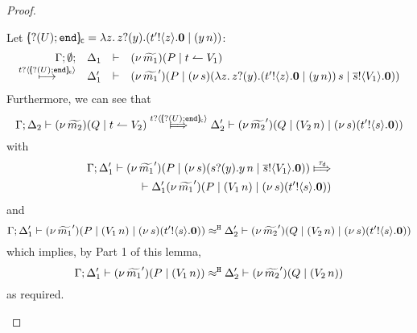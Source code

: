 \begin{proof}
\begin{enumerate}[$-$]
\begin{enumerate}
\begin{enumerate}[i)]
							Let $[\!\!(? (U) ; \mathtt{end})\!\!]_{\mathsf{c}} = \lambda z.\, z ? (y) . ( t' ! \langle z \rangle . \mathbf{0} \;|\; (y\, {n}) ) $:
							\[
								\begin{array}{rcll} \Gamma; \emptyset; &\Delta_1& \vdash& (\nu\, \widetilde{m_1})(P \;|\; t \leftharpoonup V_1  ) \\ \stackrel{t ? \langle [\!\!(? (U) ; \mathtt{end})\!\!]_{\mathsf{c}} \rangle}{\longmapsto} &\Delta_1'& \vdash &  (\nu\, \widetilde{m_1}')(P \;|\; (\nu\, s)(\lambda z.\, z ? (y) . ( t' ! \langle z \rangle . \mathbf{0} \;|\; (y\, {n}) )\, {s} \;|\; \overline{s} ! \langle V_1 \rangle . \mathbf{0})) \end{array}
							\]
							Furthermore, we can see that
							\[
	\horel{\Gamma}{\Delta_2}{\newsp{\widetilde{m_2}}{Q \Par \ntrigger{t}{V_2}  } }
								{\Hby{\bactinp{t}{\omapchar{\btinp{U} \tinact}}}}
								{\Delta_2'}{\newsp{\widetilde{m_2}'}{Q \Par (\appl{V_2}{n}) \Par \newsp{s}{\bout{t'}{s} \inact}}}
							\]
							with
							\begin{eqnarray*}
								\horel{\Gamma}{\Delta_1'}{\newsp{\widetilde{m_1}'}{P \Par \newsp{s}{\binp{s}{y} \appl{y}{n} \Par \bout{\dual{s}}{V_1} \inact}}}
								{\Hby{\dtau}} \\
								 {\Delta_1'}{\newsp{\widetilde{m_1}'}{P \Par (\appl{V_1}{n}) \Par \newsp{s}{\bout{t'}{s} \inact}}}
							\end{eqnarray*}
							and
							\[
								\Gamma; \Delta_1' \vdash (\nu\, \widetilde{m_1}')(P \;|\; (V_1\, {n}) \;|\; (\nu\, s)(t' ! \langle s \rangle . \mathbf{0})) \approx^\mathtt{H} \Delta_2' \vdash (\nu\, \widetilde{m_2}')(Q \;|\; (V_2\, {n}) \;|\; (\nu\, s)(t' ! \langle s \rangle . \mathbf{0}))
							\]
							which implies, by Part 1 of this lemma,
							\[
								\Gamma; \Delta_1' \vdash (\nu\, \widetilde{m_1}')(P \;|\; (V_1\, {n})) \approx^\mathtt{H} \Delta_2' \vdash (\nu\, \widetilde{m_2}')(Q \;|\; (V_2\, {n}) )
							\]
							as required.


\end{enumerate}
\end{enumerate}
\end{enumerate}
\end{proof}
